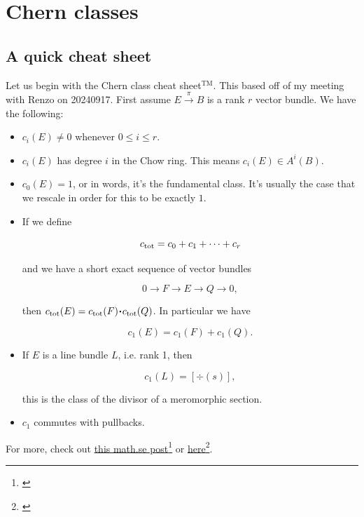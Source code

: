\documentclass[12pt]{memoir}
\begin{document}
\section{Chern classes}

\subsection{A quick cheat sheet}

Let us begin with the Chern class cheat sheet\({}^{\text{TM}}\). This based off of my meeting with Renzo on 20240917. First assume \(E\xrightarrow{\pi}B\) is a rank \(r\) vector bundle. We have the following:

\begin{itemize}
    \item \(c_i(E)\neq 0\) whenever \(0\leq i\leq r\).
    \item \(c_i(E)\) has degree \(i\) in the Chow ring. This means \(c_i(E)\in A^i(B)\).%
    \item \(c_0(E)=1\), or in words, it's the fundamental class. It's usually the case that we rescale in order for this to be exactly \(1\).
    \item If we define

          \[c_{\operatorname{tot}}=c_0+c_1+\dots+c_r\]

          and we have a short exact sequence of vector bundles

          \[0\to F\to E\to Q\to 0,\]

          then \(c_{\tot}(E)=c_{\tot}(F)\.c_{\tot}(Q)\). In particular we have

          \[c_1(E)=c_1(F)+c_1(Q).\]

    \item If \(E\) is a line bundle \(L\), i.e. rank 1, then

          \[c_1(L)=[\div(s)],\]

          this is the class of the divisor of a meromorphic section.
    \item \(c_1\) commutes with pullbacks.
\end{itemize}

For more, check out \href{https://math.stackexchange.com/questions/989147/quick-question-chern-classes-of-sym-wedge-hom-and-tensor}{this math.se post}\footnote{\href{math.stackexchange.com/q/989147/}{}} or \href{https://rigtriv.wordpress.com/2009/11/03/chern-classes-part-1/}{here}\footnote{\href{https://rigtriv.wordpress.com/2009/11/03/chern-classes-part-1/}{}}.
\end{document}
